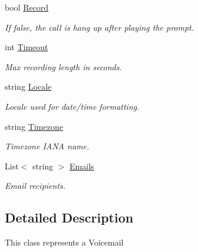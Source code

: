 \begin{DoxyCompactItemize}
bool \hyperlink{class_thecallr_api_1_1_objects_1_1_app_1_1_param_1_1_vms_a22fad0cb2e2243b2712445daf007a97c}{Record}
\begin{DoxyCompactList}\small\item\em If {\ttfamily false}, the call is hang up after playing the prompt. \end{DoxyCompactList}\item 
int \hyperlink{class_thecallr_api_1_1_objects_1_1_app_1_1_param_1_1_vms_ad443b458fb9fd27b6ac5b900d6ad284c}{Timeout}
\begin{DoxyCompactList}\small\item\em Max recording length in seconds. \end{DoxyCompactList}\item 
string \hyperlink{class_thecallr_api_1_1_objects_1_1_app_1_1_param_1_1_vms_af0d9b7c568758a880708e66aad5088da}{Locale}
\begin{DoxyCompactList}\small\item\em Locale used for date/time formatting. \end{DoxyCompactList}\item 
string \hyperlink{class_thecallr_api_1_1_objects_1_1_app_1_1_param_1_1_vms_a9abf635b1d566fa90a73a857e42b0f30}{Timezone}
\begin{DoxyCompactList}\small\item\em Timezone I\+A\+N\+A name. \end{DoxyCompactList}\item 
List$<$ string $>$ \hyperlink{class_thecallr_api_1_1_objects_1_1_app_1_1_param_1_1_vms_ab3e6a64404a32328cbd1675d7a775ed6}{Emails}
\begin{DoxyCompactList}\small\item\em Email recipients. \end{DoxyCompactList}\end{DoxyCompactItemize}


\subsection{Detailed Description}
This class represents a Voicemail 



